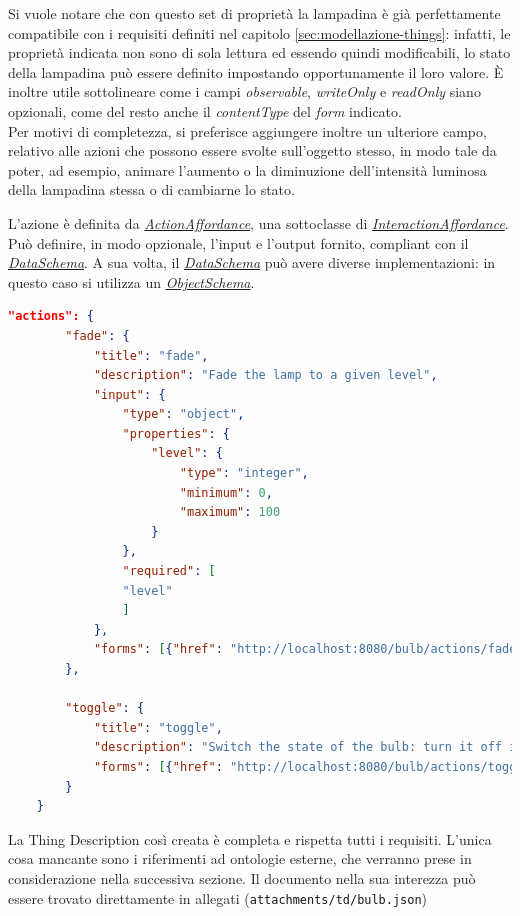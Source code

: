 \documentclass[12pt,a4paper,openright,oneside]{report}
\begin{document}
Si vuole notare che con questo set di proprietà la lampadina è già perfettamente compatibile con i requisiti definiti nel capitolo \ref{sec:modellazione-things}: infatti, le proprietà indicata non sono di sola lettura ed essendo quindi modificabili, lo stato della lampadina può essere definito impostando opportunamente il loro valore. È inoltre utile sottolineare come i campi \textit{observable}, \textit{writeOnly} e \textit{readOnly} siano opzionali, come del resto anche il \textit{contentType} del \textit{form} indicato.\\

Per motivi di completezza, si preferisce aggiungere inoltre un ulteriore campo, relativo alle azioni che possono essere svolte sull'oggetto stesso, in modo tale da poter, ad esempio, animare l'aumento o la diminuzione dell'intensità luminosa della lampadina stessa o di cambiarne lo stato.

L'azione è definita da \textit{\href{https://www.w3.org/TR/wot-thing-description/\#actionaffordance}{ActionAffordance}}, una sottoclasse di \textit{\href{https://www.w3.org/TR/wot-thing-description/\#interactionaffordance}{InteractionAffordance}}. Può definire, in modo opzionale, l'input e l'output fornito, compliant con il \textit{\href{https://www.w3.org/TR/wot-thing-description/\#dataschema}{DataSchema}}. A sua volta, il \textit{\href{https://www.w3.org/TR/wot-thing-description/\#dataschema}{DataSchema}} può avere diverse implementazioni: in questo caso si utilizza un \textit{\href{https://www.w3.org/TR/wot-thing-description/\#objectschema}{ObjectSchema}}.

\clearpage
\begin{lstlisting}[language=json,caption={Azioni di una lampadina},label=lst:start4-td-lamp]
	"actions": {
		"fade": {
			"title": "fade",
			"description": "Fade the lamp to a given level",
			"input": {
				"type": "object",
				"properties": {
					"level": {
						"type": "integer",
						"minimum": 0,
						"maximum": 100
					}
				},
				"required": [
				"level"
				]
			},
			"forms": [{"href": "http://localhost:8080/bulb/actions/fade"}]
		},
		
		"toggle": {
			"title": "toggle",
			"description": "Switch the state of the bulb: turn it off if on or turn it on when off.",
			"forms": [{"href": "http://localhost:8080/bulb/actions/toggle"}]
		}
	}
\end{lstlisting}

La Thing Description così creata è completa e rispetta tutti i requisiti. L'unica cosa mancante sono i riferimenti ad ontologie esterne, che verranno prese in considerazione nella successiva sezione. Il documento nella sua interezza può essere trovato direttamente in allegati (\texttt{attachments/td/bulb.json})
\end{document}
